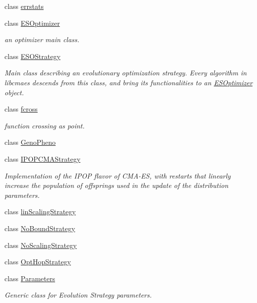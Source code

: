 \begin{DoxyCompactItemize}
class \hyperlink{classlibcmaes_1_1errstats}{errstats}
\item 
class \hyperlink{classlibcmaes_1_1ESOptimizer}{E\+S\+Optimizer}
\begin{DoxyCompactList}\small\item\em an optimizer main class. \end{DoxyCompactList}\item 
class \hyperlink{classlibcmaes_1_1ESOStrategy}{E\+S\+O\+Strategy}
\begin{DoxyCompactList}\small\item\em Main class describing an evolutionary optimization strategy. Every algorithm in libcmaes descends from this class, and bring its functionalities to an \hyperlink{classlibcmaes_1_1ESOptimizer}{E\+S\+Optimizer} object. \end{DoxyCompactList}\item 
class \hyperlink{classlibcmaes_1_1fcross}{fcross}
\begin{DoxyCompactList}\small\item\em function crossing as point. \end{DoxyCompactList}\item 
class \hyperlink{classlibcmaes_1_1GenoPheno}{Geno\+Pheno}
\item 
class \hyperlink{classlibcmaes_1_1IPOPCMAStrategy}{I\+P\+O\+P\+C\+M\+A\+Strategy}
\begin{DoxyCompactList}\small\item\em Implementation of the I\+P\+O\+P flavor of C\+M\+A-\/\+E\+S, with restarts that linearly increase the population of offsprings used in the update of the distribution parameters. \end{DoxyCompactList}\item 
class \hyperlink{classlibcmaes_1_1linScalingStrategy}{lin\+Scaling\+Strategy}
\item 
class \hyperlink{classlibcmaes_1_1NoBoundStrategy}{No\+Bound\+Strategy}
\item 
class \hyperlink{classlibcmaes_1_1NoScalingStrategy}{No\+Scaling\+Strategy}
\item 
class \hyperlink{classlibcmaes_1_1OptHopStrategy}{Opt\+Hop\+Strategy}
\item 
class \hyperlink{classlibcmaes_1_1Parameters}{Parameters}
\begin{DoxyCompactList}\small\item\em Generic class for Evolution Strategy parameters. \end{DoxyCompactList}\item 

\end{DoxyCompactItemize}
